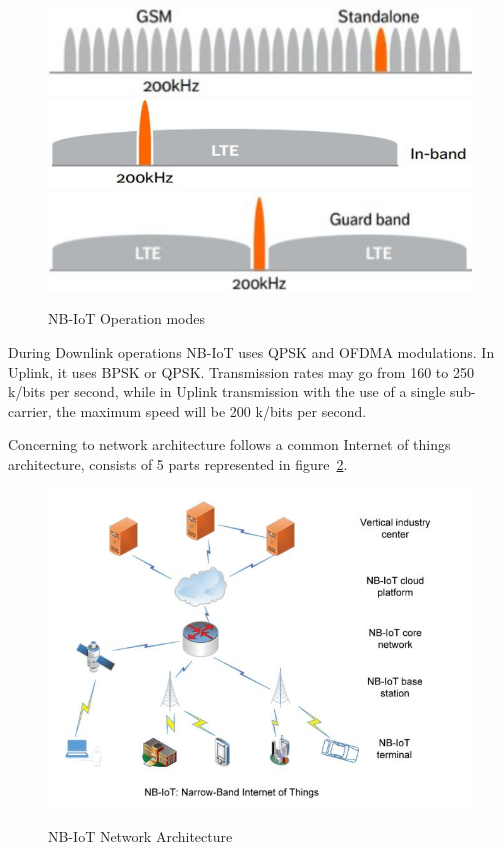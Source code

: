 \begin{figure}[htbp]
  \centering
    {\includegraphics[width=0.33\linewidth]{Chapters/Figures/NB-Stand-Alone.JPG}}%
    {\includegraphics[width=0.33\linewidth]{Chapters/Figures/NB-In-Band.JPG}}%
    {\includegraphics[width=0.33\linewidth]{Chapters/Figures/NB-Guard-Band.JPG}}%
  \caption{NB-IoT Operation modes~\cite{Ericson}}
  \label{fig:NBfig3subfig}
\end{figure}



During Downlink operations NB-IoT uses QPSK and OFDMA modulations. In Uplink, it uses BPSK or QPSK. Transmission rates may go from 160 to 250 k/bits per second, while in Uplink transmission with the use of a single sub-carrier, the maximum speed will be 200 k/bits per second.

Concerning to network architecture follows a common Internet of things architecture, consists of 5 parts represented in figure~\ref{fig:NB_Network}.
\begin{figure}[htbp]
  \centering
  
    {\includegraphics[height=3 in,width=0.75\linewidth]{Chapters/Figures/NB-Network.JPG}}%
 
  \caption{NB-IoT Network Architecture~\cite{Chen2017}}
  \label{fig:NB_Network}
\end{figure}

